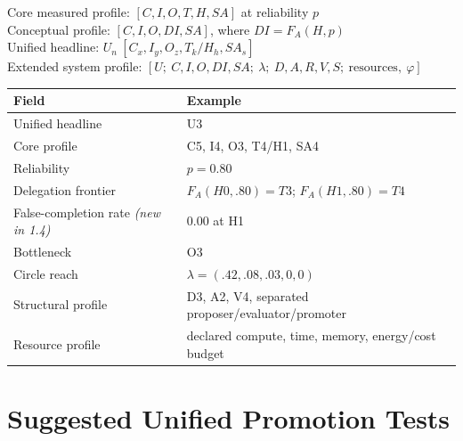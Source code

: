 \documentclass[11pt]{article}
\theoremstyle{definition}
\newcommand{\FA}{\ensuremath{F_A(H,p)}}
\begin{document}
\begin{center}
Core measured profile: $[C, I, O, T, H, SA]$ at reliability $p$\\
Conceptual profile: $[C, I, O, DI, SA]$, where $DI = \FA{}$\\
Unified headline: $U_n\ [C_x, I_y, O_z, T_k/H_h, SA_s]$\\
Extended system profile: $[U;\ C,I,O,DI,SA;\ \lambda;\ D,A,R,V,S;\ \text{resources},\ \varphi]$
\end{center}

\begin{table}[h]
\centering\small
\begin{tabularx}{\textwidth}{@{}lY@{}}
\toprule
Field & Example \\
\midrule
Unified headline & U3 \\
Core profile & C5, I4, O3, T4/H1, SA4 \\
Reliability & $p = 0.80$ \\
Delegation frontier & $F_A(H0,.80)=T3$; $F_A(H1,.80)=T4$ \\
False-completion rate \emph{(new in 1.4)} & 0.00 at H1 \\
Bottleneck & O3 \\
Circle reach & $\lambda = (.42,.08,.03,0,0)$ \\
Structural profile & D3, A2, V4, separated proposer/evaluator/promoter \\
Resource profile & declared compute, time, memory, energy/cost budget \\
\bottomrule
\end{tabularx}
\end{table}

\section{Suggested Unified Promotion Tests}
\end{document}
